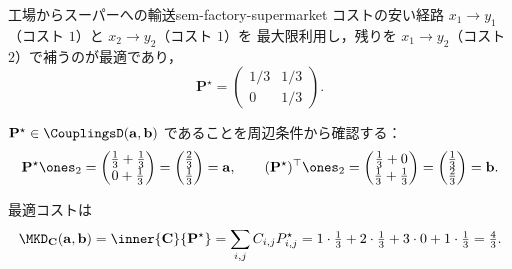\begin{example}{工場からスーパーへの輸送}{sem-factory-supermarket}
  コストの安い経路 $x_1 \to y_1$（コスト $1$）と $x_2 \to y_2$（コスト $1$）を
  最大限利用し，残りを $x_1 \to y_2$（コスト $2$）で補うのが最適であり，
  \[
    \mathbf{P}^{\star} =
    \begin{pmatrix}
      1/3 & 1/3 \\
      0 & 1/3
    \end{pmatrix}.
  \]

  $\mathbf{P}^{\star} \in \CouplingsD(\mathbf{a}, \mathbf{b})$ であることを周辺条件から確認する：
  \[
    \mathbf{P}^{\star}\ones_2
    = \begin{pmatrix} \tfrac{1}{3} + \tfrac{1}{3} \\ 0 + \tfrac{1}{3} \end{pmatrix}
    = \begin{pmatrix} \tfrac{2}{3} \\ \tfrac{1}{3} \end{pmatrix}
    = \mathbf{a},
    \qquad
    (\mathbf{P}^{\star})^\top\ones_2
    = \begin{pmatrix} \tfrac{1}{3} + 0 \\ \tfrac{1}{3} + \tfrac{1}{3} \end{pmatrix}
    = \begin{pmatrix} \tfrac{1}{3} \\ \tfrac{2}{3} \end{pmatrix}
    = \mathbf{b}.
  \]


  最適コストは
  \[
    \MKD_{\mathbf{C}}(\mathbf{a}, \mathbf{b})
    = \inner{\mathbf{C}}{\mathbf{P}^{\star}}
    = \sum_{i,j} C_{i,j} P_{i,j}^{\star}
    = 1 \cdot \tfrac{1}{3} + 2 \cdot \tfrac{1}{3} + 3 \cdot 0 + 1 \cdot \tfrac{1}{3}
    = \tfrac{4}{3}.
  \]


\end{example}
